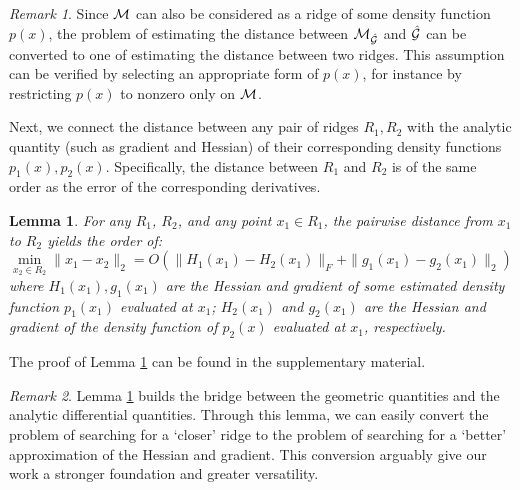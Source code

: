 \documentclass[aos,preprint]{imsart}
\newtheorem{lemma}[theorem]{Lemma}
\theoremstyle{remark}
\newtheorem*{remark}{Remark}
\begin{document}
\begin{remark}
Since $\cal M$ can also be considered  as a ridge of some density function $p(x)$, the problem of estimating the distance between $\cal M_{\hat{\cal G}}$ and $\hat{\cal G}$ can be converted to one of estimating the distance between two ridges. 
This assumption can be verified by selecting an appropriate form of $p(x)$, for instance by restricting $p(x)$ to nonzero only on $\cal M$. 
\end{remark}
Next, we connect the distance between any pair of ridges $R_1, R_2$ with the analytic quantity (such as gradient and Hessian) of their corresponding density functions $p_1(x), p_2(x)$. 
Specifically, the  distance between $R_1$ and $R_2$ is of the same order as the error of the corresponding derivatives. 
\begin{lemma}{ 
For any $R_1$, $R_2$, and any point $x_1\in R_1$, the pairwise distance from $x_1$ to $R_2$ yields the order of: %
\[
\min_{x_2\in R_2}\|x_1-x_2\|_2 = O(\|H_1(x_1)-H_2(x_1)\|_F+\|g_1(x_1)-g_2(x_1)\|_2)
\]
where $H_1(x_1), g_1 (x_1)$ are the Hessian and gradient of some estimated density function $p_1(x_1)$ evaluated at $x_1$; $H_2(x_1)$ and $g_2(x_1)$ are the Hessian and gradient of the density function of $p_2(x)$ evaluated at $x_1$, respectively.
 }\label{margin}
\end{lemma}
The proof of Lemma \ref{margin} can be found in the supplementary material.%
\begin{remark}
Lemma \ref{margin} builds the bridge between the geometric quantities and the analytic differential quantities. Through this lemma, we can easily convert the problem of searching for a `closer' ridge to the problem of searching for a `better' approximation of the Hessian and gradient. This conversion arguably give our work a stronger foundation and greater versatility.
\end{remark}
\end{document}

